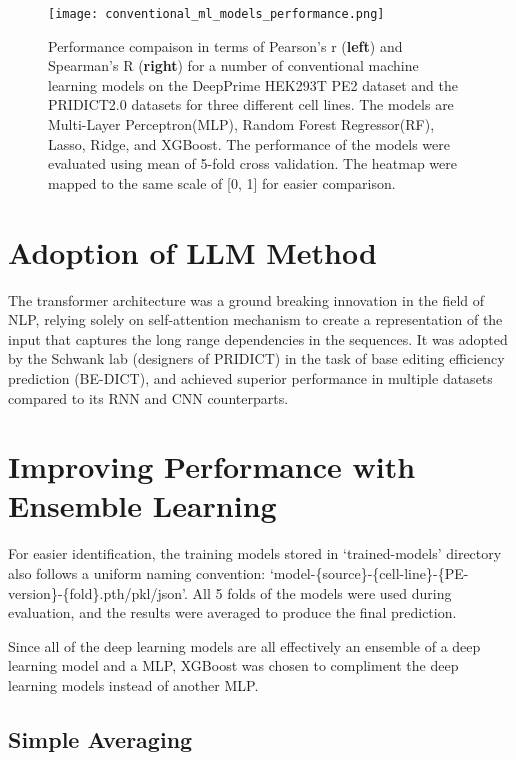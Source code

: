 \begin{figure}
    \centering
    \texttt{[image: conventional\_ml\_models\_performance.png]}
    \caption[Conventional ML model performance comparison]{Performance compaison in terms of Pearson's r (\textbf{left}) and Spearman's R (\textbf{right}) for a number of conventional machine learning models on the DeepPrime HEK293T PE2 dataset and the PRIDICT2.0 datasets for three different cell lines. The models are Multi-Layer Perceptron(MLP), Random Forest Regressor(RF), Lasso, Ridge, and XGBoost. The performance of the models were evaluated using mean of 5-fold cross validation. The heatmap were mapped to the same scale of [0, 1] for easier comparison.}
    \label{fig:conventional_ml_models_performance}
\end{figure}


\section{Adoption of LLM Method}

The transformer architecture was a ground breaking innovation in the field of NLP, relying solely on self-attention mechanism to create a representation of the input that captures the long range dependencies in the sequences. It was adopted by the Schwank lab (designers of PRIDICT) in the task of base editing efficiency prediction (BE-DICT), and achieved superior performance in multiple datasets compared to its RNN and CNN counterparts\cite{marquartPredictingBaseEditing2021}.

\section{Improving Performance with Ensemble Learning}





For easier identification, the training models stored in `trained-models' directory also follows a uniform naming convention: `model-\{source\}-\{cell-line\}-\{PE-version\}-\{fold\}.pth/pkl/json'. All 5 folds of the models were used during evaluation, and the results were averaged to produce the final prediction. 

Since all of the deep learning models are all effectively an ensemble of a deep learning model and a MLP, XGBoost was chosen to compliment the deep learning models instead of another MLP.

\subsection{Simple Averaging}

